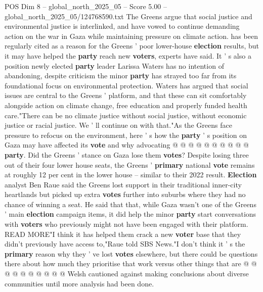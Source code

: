 \begin{textsample}{POS Dim 8 – global\_north\_2025\_05 – Score 5.00 – global\_north\_2025\_05/124768590.txt}  \label{ex:f8_pos_406}
The Greens argue that social justice and environmental justice is interlinked, and have vowed to continue demanding action on the war in Gaza while maintaining pressure on climate action. has been regularly cited as a reason for the Greens ' poor lower-house \textbf{election} results, but it may have helped the \textbf{party} reach new \textbf{voters}, experts have said.
It ' s also a position newly elected \textbf{party} leader Larissa Waters has no intention of abandoning, despite criticism the minor \textbf{party} has strayed too far from its foundational focus on environmental protection.
Waters has argued that social issues are central to the Greens ' platform, and that these can sit comfortably alongside action on climate change, free education and properly funded health care."There can be no climate justice without social justice, without economic justice or racial justice.
We ' ll continue on with that."As the Greens face pressure to refocus on the environment, here ' s how the \textbf{party} ' s position on Gaza may have affected its \textbf{vote} and why advocating @ @ @ @ @ @ @ @ @ @ \textbf{party}.
Did the Greens ' stance on Gaza lose them \textbf{votes}?
Despite losing three out of their four lower house seats, the Greens ' \textbf{primary} national \textbf{vote} remains at roughly 12 per cent in the lower house -- similar to their 2022 result. \textbf{Election} analyst Ben Raue said the Greens lost support in their traditional inner-city heartlands but picked up extra \textbf{votes} further into suburbs where they had no chance of winning a seat.
He said that that, while Gaza wasn't one of the Greens ' main \textbf{election} campaign items, it did help the minor \textbf{party} start conversations with \textbf{voters} who previously might not have been engaged with their platform.
READ MORE"I think it has helped them crack a new \textbf{voter} base that they didn't previously have access to,"Raue told SBS News."I don't think it ' s the \textbf{primary} reason why they ' ve lost \textbf{votes} elsewhere, but there could be questions there about how much they prioritise that work versus other things that are @ @ @ @ @ @ @ @ @ @ Welsh cautioned against making conclusions about diverse communities until more analysis had been done.

\end{textsample}
